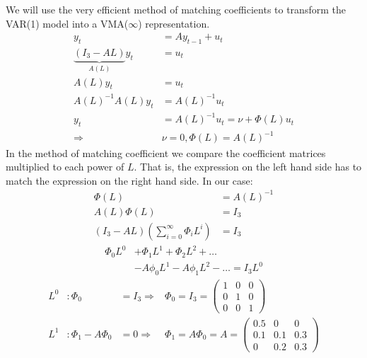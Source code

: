 \begin{enumerate}
\begin{solution}
              We will use the very efficient method of matching coefficients to transform the VAR(1) model into a VMA($\infty$) representation.
              \begin{align*}
                  y_t                                 & = A y_{t-1} + u_t                   \\
                  \underbrace{(I_3 - A L)}_{A(L)} y_t & = u_t                               \\
                  A(L) y_t                            & = u_t                               \\
                  A(L)^{-1}A(L) y_t                   & = A(L)^{-1} u_t                     \\
                  y_t                                 & = A(L)^{-1} u_t = \nu + \Phi(L) u_t \\
                  \Rightarrow                         & \nu= 0, \Phi(L) = A(L)^{-1}
              \end{align*}
              In the method of matching coefficient we compare the coefficient matrices multiplied to each power of $L$. That is, the expression on the left hand side has to match the expression on the right hand side. In our case:
              \begin{align*}
                  \Phi(L)                                               & = A(L)^{-1} \\
                  A(L) \Phi(L)                                          & = I_3       \\
                  (I_3 - A L) \left(\sum_{i=0}^\infty \Phi_i L^i\right) & = I_3
              \end{align*}
              \begin{align*}
                  \Phi_0 L^0 & + \Phi_1 L^1 + \Phi_2 L^2 + \dots               \\
                             & - A \phi_0 L^1 - A \phi_1 L^2 - \dots = I_3 L^0
              \end{align*}
              \begin{align}
                  L^0 & : \Phi_0                                     & = I_3 \Rightarrow & \Phi_0 = I_3 = \begin{pmatrix}1&0&0\\0&1&0\\0&0&1 \end{pmatrix}\nonumber                                 \\
                  L^1 & : \Phi_1 - A \Phi_0                          & = 0 \Rightarrow   & \Phi_1 = A \Phi_0 = A = \begin{pmatrix}0.5&0&0\\0.1&0.1&0.3\\0&0.2&0.3 \end{pmatrix}\nonumber            \\

\end{align}
\end{solution}
\end{enumerate}

